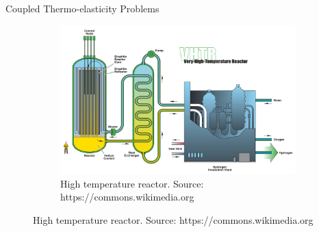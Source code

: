 \documentclass{beamer}
\begin{document}
\begin{frame}[t,fragile]{Coupled Thermo-elasticity Problems}
\begin{figure}[H]
\begin{subfigure}{0.45\textwidth}
    \centering
 \includegraphics[scale=.05]{reator.png}
 \caption{\tiny{High temperature reactor. Source: https://commons.wikimedia.org}}
 \label{2}
 \end{subfigure}
\label{fig:caption}
\end{figure}
\end{frame}
\end{document}
